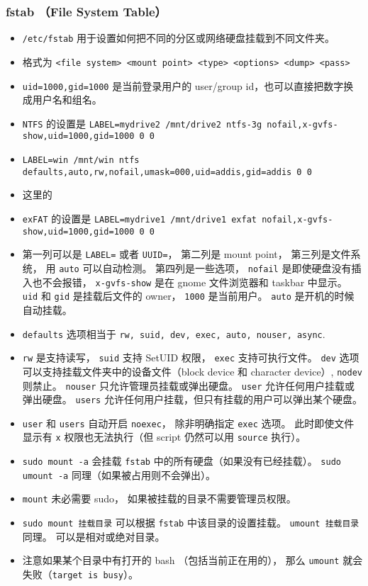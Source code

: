 \subsubsection{fstab （File System Table）}
\begin{itemize}
\item \verb`/etc/fstab` 用于设置如何把不同的分区或网络硬盘挂载到不同文件夹。
\item 格式为 \verb`<file system> <mount point> <type> <options> <dump> <pass>`
\item \verb`uid=1000,gid=1000` 是当前登录用户的 user/group id，也可以直接把数字换成用户名和组名。
\item \verb`NTFS` 的设置是 \verb`LABEL=mydrive2 /mnt/drive2 ntfs-3g nofail,x-gvfs-show,uid=1000,gid=1000 0 0`
\item \verb`LABEL=win /mnt/win ntfs defaults,auto,rw,nofail,umask=000,uid=addis,gid=addis 0 0`
\item 这里的
\item \verb`exFAT` 的设置是 \verb`LABEL=mydrive1 /mnt/drive1 exfat nofail,x-gvfs-show,uid=1000,gid=1000 0 0`
\item 第一列可以是 \verb`LABEL=` 或者 \verb`UUID=`， 第二列是 mount point， 第三列是文件系统， 用 \verb`auto` 可以自动检测。 第四列是一些选项， \verb`nofail` 是即使硬盘没有插入也不会报错， \verb`x-gvfs-show` 是在 gnome 文件浏览器和 taskbar 中显示。 \verb`uid` 和 \verb`gid` 是挂载后文件的 owner， \verb`1000` 是当前用户。 \verb`auto` 是开机的时候自动挂载。
\item \verb`defaults` 选项相当于 \verb`rw, suid, dev, exec, auto, nouser, async`.
\item \verb`rw` 是支持读写， \verb`suid` 支持 SetUID 权限， \verb`exec` 支持可执行文件。 \verb`dev` 选项可以支持挂载文件夹中的设备文件（block device 和 character device）, \verb`nodev` 则禁止。 \verb`nouser` 只允许管理员挂载或弹出硬盘。 \verb`user` 允许任何用户挂载或弹出硬盘。 \verb`users` 允许任何用户挂载，但只有挂载的用户可以弹出某个硬盘。
\item \verb`user` 和 \verb`users` 自动开启 \verb`noexec`， 除非明确指定 \verb`exec` 选项。 此时即使文件显示有 \verb`x` 权限也无法执行（但 script 仍然可以用 \verb`source` 执行）。
\item \verb`sudo mount -a` 会挂载 \verb`fstab` 中的所有硬盘（如果没有已经挂载）。 \verb`sudo umount -a` 同理（如果被占用则不会弹出）。
\item \verb`mount` 未必需要 sudo， 如果被挂载的目录不需要管理员权限。
\item \verb`sudo mount 挂载目录` 可以根据 \verb`fstab` 中该目录的设置挂载。 \verb`umount 挂载目录` 同理。 可以是相对或绝对目录。
\item 注意如果某个目录中有打开的 bash （包括当前正在用的）， 那么 \verb`umount` 就会失败（\verb`target is busy`）。
\end{itemize}

